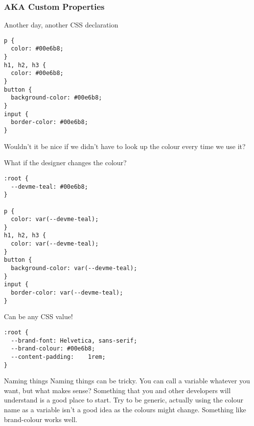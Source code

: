 \subsubsection{AKA Custom Properties}

Another day, another CSS declaration

\begin{verbatim}
p {
  color: #00e6b8;
}
h1, h2, h3 {
  color: #00e6b8;
}
button {
  background-color: #00e6b8;
}
input {
  border-color: #00e6b8;
}
\end{verbatim}

Wouldn't it be nice if we didn't have to look up the colour every time we use it?

What if the designer changes the colour?

\begin{verbatim}
:root {
  --devme-teal: #00e6b8;
}

p {
  color: var(--devme-teal);
}
h1, h2, h3 {
  color: var(--devme-teal);
}
button {
  background-color: var(--devme-teal);
}
input {
  border-color: var(--devme-teal);
}
\end{verbatim}

Can be any CSS value!

\begin{verbatim}
:root {
  --brand-font: Helvetica, sans-serif;
  --brand-colour: #00e6b8;
  --content-padding:    1rem;
}
\end{verbatim}

\begin{infobox}{Naming things}
    Naming things can be tricky. You can call a variable whatever you want, but what makes sense? Something that you and other developers will understand is a good place to start. Try to be generic, actually using the colour name as a variable isn't a good idea as the colours might change. Something like brand-colour works well.
\end{infobox}

